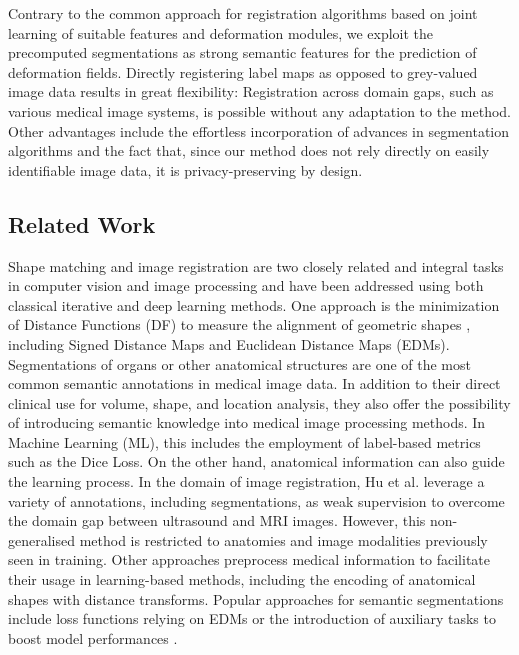 Contrary to the common approach for registration algorithms based on joint learning of suitable features and deformation modules, we exploit the precomputed segmentations as strong semantic features for the prediction of deformation fields. 
Directly registering label maps as opposed to grey-valued image data results in great flexibility: Registration across domain gaps, such as various medical image systems, is possible without any adaptation to the method. Other advantages include the effortless incorporation of advances in segmentation algorithms and the fact that, since our method does not rely directly on easily identifiable image data, it is privacy-preserving by design.

\subsection*{Related Work}
Shape matching and image registration are two closely related and integral tasks in computer vision and image processing and have been addressed using both classical iterative and deep learning methods. One approach is the minimization of Distance Functions (DF) to measure the alignment of geometric shapes \citep{Paragios2003ShapeReg}, including Signed Distance Maps and Euclidean Distance Maps (EDMs).   Segmentations of organs or other anatomical structures are one of the most common semantic annotations in medical image data. In addition to their direct clinical use for volume, shape, and location analysis, they also offer the possibility of introducing semantic knowledge into medical image processing methods. In Machine Learning (ML), this includes the employment of label-based metrics such as the Dice Loss. On the other hand, anatomical information can also guide the learning process. In the domain of image registration,  Hu et al. \citep{Hu2018WeaklySupervisedMRUS} leverage a variety of annotations, including segmentations, as weak supervision to overcome the domain gap between ultrasound and MRI images. However, this non-generalised method is restricted to anatomies and image modalities previously seen in training. Other approaches preprocess medical information to facilitate their usage in learning-based methods, including the encoding of anatomical shapes with distance transforms. Popular approaches for semantic segmentations include  loss functions relying on EDMs or the introduction of auxiliary tasks to boost model performances \citep{Ma2020Sep}. 

